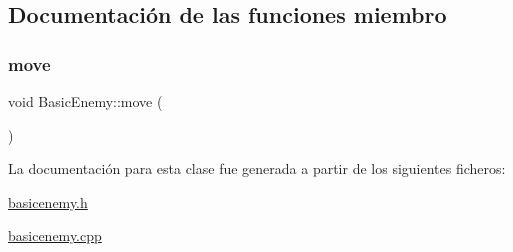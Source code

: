 \subsection{Documentación de las funciones miembro}
\hypertarget{class_basic_enemy_ad491ec5aa0aee2b51399181f5e8259db}{}\label{class_basic_enemy_ad491ec5aa0aee2b51399181f5e8259db} 
\subsubsection{\texorpdfstring{move}{move}}
{\footnotesize\ttfamily void Basic\+Enemy\+::move (\begin{DoxyParamCaption}{ }\end{DoxyParamCaption})\hspace{0.3cm}{\ttfamily [slot]}}



La documentación para esta clase fue generada a partir de los siguientes ficheros\+:\begin{DoxyCompactItemize}
\item 
\hyperlink{basicenemy_8h}{basicenemy.\+h}\item 
\hyperlink{basicenemy_8cpp}{basicenemy.\+cpp}\end{DoxyCompactItemize}
